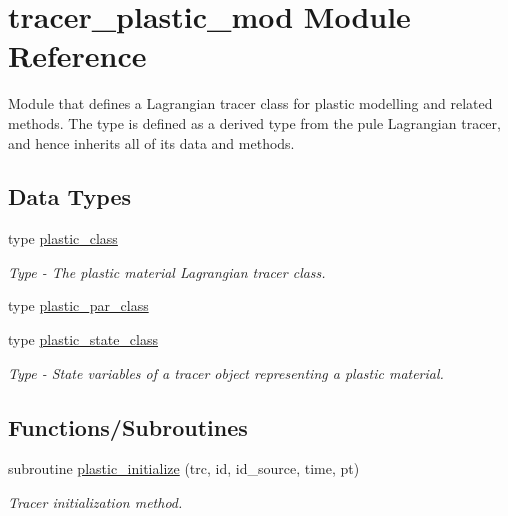 \hypertarget{namespacetracer__plastic__mod}{}\section{tracer\+\_\+plastic\+\_\+mod Module Reference}
\label{namespacetracer__plastic__mod}


Module that defines a Lagrangian tracer class for plastic modelling and related methods. The type is defined as a derived type from the pule Lagrangian tracer, and hence inherits all of it\textquotesingle{}s data and methods.  


\subsection*{Data Types}
\begin{DoxyCompactItemize}
\item 
type \hyperlink{structtracer__plastic__mod_1_1plastic__class}{plastic\+\_\+class}
\begin{DoxyCompactList}\small\item\em Type -\/ The plastic material Lagrangian tracer class. \end{DoxyCompactList}\item 
type \hyperlink{structtracer__plastic__mod_1_1plastic__par__class}{plastic\+\_\+par\+\_\+class}
\item 
type \hyperlink{structtracer__plastic__mod_1_1plastic__state__class}{plastic\+\_\+state\+\_\+class}
\begin{DoxyCompactList}\small\item\em Type -\/ State variables of a tracer object representing a plastic material. \end{DoxyCompactList}\end{DoxyCompactItemize}
\subsection*{Functions/\+Subroutines}
\begin{DoxyCompactItemize}
\item 
subroutine \hyperlink{namespacetracer__plastic__mod_a42882cd86cfe30f341d8150582a664a9}{plastic\+\_\+initialize} (trc, id, id\+\_\+source, time, pt)
\begin{DoxyCompactList}\small\item\em Tracer initialization method. \end{DoxyCompactList}\end{DoxyCompactItemize}


